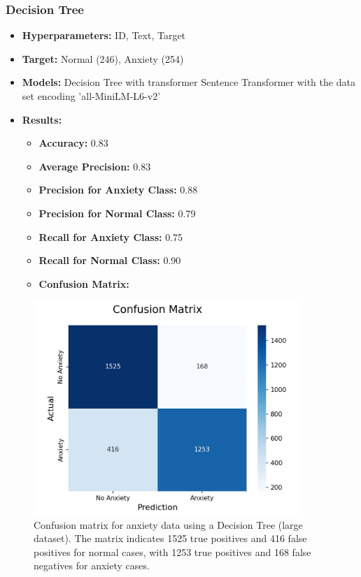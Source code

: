\documentclass[runningheads,a4paper,11pt]{report}
\begin{document}
\vspace{1cm} %

\subsubsection{Decision Tree}
\label{section:decision}

\begin{itemize}
    \item \textbf{Hyperparameters:} ID, Text, Target
    \item \textbf{Target:} Normal (246), Anxiety (254)
    \item \textbf{Models:} Decision Tree with transformer Sentence Transformer with the data set encoding 'all-MiniLM-L6-v2'
    \item \textbf{Results:}
    \begin{itemize}
        \item \textbf{Accuracy:} 0.83
        \item \textbf{Average Precision:} 0.83
        \item \textbf{Precision for Anxiety Class:} 0.88
        \item \textbf{Precision for Normal Class:} 0.79
        \item \textbf{Recall for Anxiety Class:} 0.75
        \item \textbf{Recall for Normal Class:} 0.90
        \item \textbf{Confusion Matrix:}
    \end{itemize}
\end{itemize}

\begin{figure}[h]
\centering
\includegraphics[width=0.9\textwidth]{Anxiety-Data-DecisionTree.jpg}
\caption[Confusion matrix for anxiety data (decision tree)]{\centering Confusion matrix for anxiety data using a Decision Tree (large dataset). The matrix indicates 1525 true positives and 416 false positives for normal cases, with 1253 true positives and 168 false negatives for anxiety cases.}
\end{figure}
\end{document}
